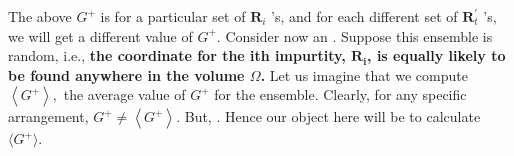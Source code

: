 The above $G^{+}$ is for a particular set of $\mathbf{R}_{i}$ 's, and for each different set of $\mathbf{R}_{t}^{\prime}$ 's, we will get a different value of $G^{+} .$ Consider now an . Suppose this ensemble is random, i.e., \textbf{the coordinate for the ith impurtity, $\mathbf{R}_{\mathbf{i}}$, is equally likely to be found anywhere in the volume $\Omega$.} Let us imagine that we compute $\left\langle G^{+}\right\rangle,$ the average value of $G^{+}$ for the ensemble. Clearly, for any specific arrangement, $G^{+} \neq\left\langle G^{+}\right\rangle .$ But, . Hence our object here will be to calculate $\langle G^+\rangle$.

